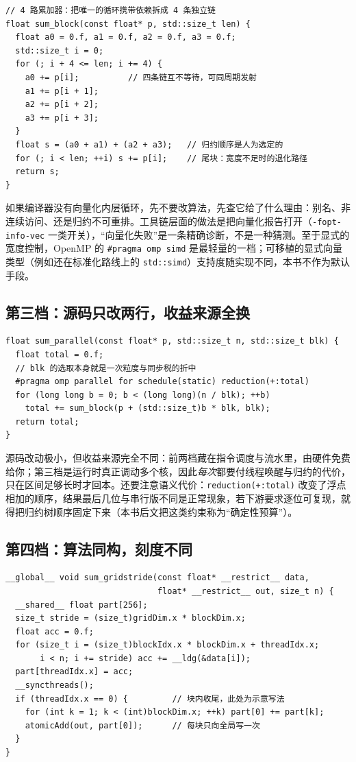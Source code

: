\documentclass[12pt,a4paper,fontset=fandol]{ctexbook}
\newcommand{\Tp}[1]{\texttt{#1}}
\begin{document}
\begin{lstlisting}[style=cppstyle,caption={串行分块求和：只依赖 ILP 与 SIMD 的自然余量}]
// 4 路累加器：把唯一的循环携带依赖拆成 4 条独立链
float sum_block(const float* p, std::size_t len) {
  float a0 = 0.f, a1 = 0.f, a2 = 0.f, a3 = 0.f;
  std::size_t i = 0;
  for (; i + 4 <= len; i += 4) {
    a0 += p[i];          // 四条链互不等待，可同周期发射
    a1 += p[i + 1];
    a2 += p[i + 2];
    a3 += p[i + 3];
  }
  float s = (a0 + a1) + (a2 + a3);   // 归约顺序是人为选定的
  for (; i < len; ++i) s += p[i];    // 尾块：宽度不足时的退化路径
  return s;
}
\end{lstlisting}

如果编译器没有向量化内层循环，先不要改算法，先查它给了什么理由：别名、非连续访问、还是归约不可重排。工具链层面的做法是把向量化报告打开（\Tp{-fopt-info-vec} 一类开关），``向量化失败''是一条精确诊断，不是一种猜测。至于显式的宽度控制，OpenMP 的 \Tp{\#pragma omp simd} 是最轻量的一档；可移植的显式向量类型（例如还在标准化路线上的 \Tp{std::simd}）支持度随实现不同，本书不作为默认手段。

\subsection{第三档：源码只改两行，收益来源全换}

\begin{lstlisting}[style=cppstyle,caption={同一算法升到线程级：分块仍是同一段串行代码}]
float sum_parallel(const float* p, std::size_t n, std::size_t blk) {
  float total = 0.f;
  // blk 的选取本身就是一次粒度与同步税的折中
  #pragma omp parallel for schedule(static) reduction(+:total)
  for (long long b = 0; b < (long long)(n / blk); ++b)
    total += sum_block(p + (std::size_t)b * blk, blk);
  return total;
}
\end{lstlisting}

源码改动极小，但收益来源完全不同：前两档藏在指令调度与流水里，由硬件免费给你；第三档是运行时真正调动多个核，因此\emph{每次}都要付线程唤醒与归约的代价，只在区间足够长时才回本。还要注意语义代价：\Tp{reduction(+:total)} 改变了浮点相加的顺序，结果最后几位与串行版不同是正常现象，若下游要求逐位可复现，就得把归约树顺序固定下来（本书后文把这类约束称为``确定性预算''）。

\subsection{第四档：算法同构，刻度不同}

\begin{lstlisting}[style=cudastyle,caption={同一算法升到设备级：grid-stride 循环与一次块内归约}]
__global__ void sum_gridstride(const float* __restrict__ data,
                               float* __restrict__ out, size_t n) {
  __shared__ float part[256];
  size_t stride = (size_t)gridDim.x * blockDim.x;
  float acc = 0.f;
  for (size_t i = (size_t)blockIdx.x * blockDim.x + threadIdx.x;
       i < n; i += stride) acc += __ldg(&data[i]);
  part[threadIdx.x] = acc;
  __syncthreads();
  if (threadIdx.x == 0) {         // 块内收尾，此处为示意写法
    for (int k = 1; k < (int)blockDim.x; ++k) part[0] += part[k];
    atomicAdd(out, part[0]);      // 每块只向全局写一次
  }
}
\end{lstlisting}
\end{document}
